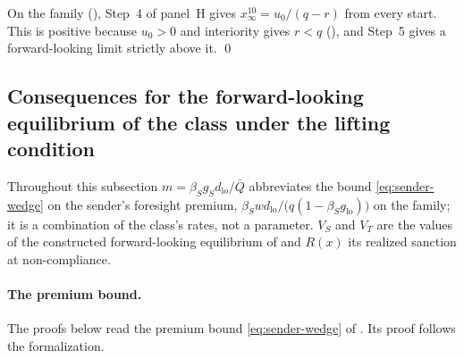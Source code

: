 On the family (), Step~4 of
panel~H gives $x^{10}_\infty=u_0/(q-r)$ from every start. This is positive because
$u_0>0$ and interiority gives $r<q$ (), and Step~5 gives a forward-looking
limit strictly above it. \qed

\subsection{Consequences for the forward-looking equilibrium of the class under the lifting condition}
\label{app:proofs:branch}

Throughout this subsection $m=\beta_S g_S d_{\mathrm{lo}}/\bar Q$ abbreviates the
bound \eqref{eq:sender-wedge} on the sender's foresight premium, $\beta_S w d_{\mathrm{lo}}/\bigl(q(1-\beta_S g_{\mathrm{lo}})\bigr)$
on the family; it is a combination of the class's rates, not a parameter. $V_S$ and $V_T$ are the values of the
constructed forward-looking equilibrium of  and
$R(x)$ its realized sanction at non-compliance.

\paragraph{The premium bound.}
The proofs below read the premium bound \eqref{eq:sender-wedge} of
. Its proof follows the formalization.

